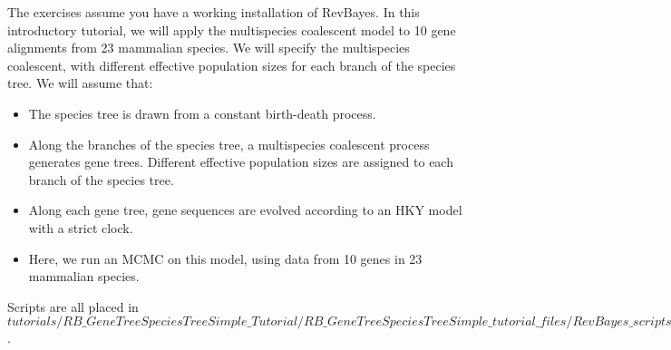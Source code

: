 \vspace{20mm}

{\begin{framed}
\begin{center}
The exercises assume you have a working installation of RevBayes.
In this introductory tutorial, we will apply the multispecies coalescent model to 10 gene alignments from 23 mammalian species.
We will specify the multispecies coalescent, with different effective population sizes for each branch of the species tree.
We will assume that:
\begin{itemize}
\item The species tree is drawn from a constant birth-death process.
\item Along the branches of the species tree, a multispecies coalescent process generates gene trees. Different effective population sizes are assigned to each branch of the species tree.
\item Along each gene tree, gene sequences are evolved according to an HKY model with a strict clock. 
\item Here, we run an MCMC on this model, using data from 10 genes in 23 mammalian species.
\end{itemize}
Scripts are all placed in {\footnotesize \emph{$tutorials/RB\_GeneTreeSpeciesTreeSimple\_Tutorial/RB\_GeneTreeSpeciesTreeSimple\_tutorial\_files/RevBayes\_scripts/$}}. 
\end{center}
\end{framed}}
\vspace{5mm}

